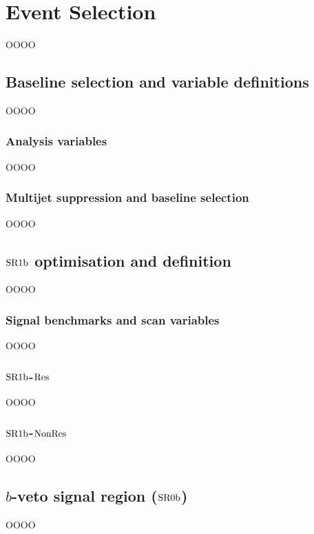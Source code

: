 \chapter{Event Selection}
\label{chap:chapter-7}

OOOO

\section{Baseline selection and variable definitions}
\label{heading:Chapters-CH7-2}

OOOO

\subsection{Analysis variables}
\label{heading:Chapters-CH7-3}

OOOO

\subsection{Multijet suppression and baseline selection}
\label{heading:Chapters-CH7-4}

OOOO

\section[$\bTagSR$ optimisation and definition]{$\bTagSR$ optimisation and definition}
\label{heading:Chapters-CH7-5}

OOOO

\subsection{Signal benchmarks and scan variables}
\label{heading:Chapters-CH7-6}

OOOO

\subsection[SR1b-Res definition]{$\bTagSR$-$\mathrm{Res}$}
\label{heading:Chapters-CH7-7}

OOOO

\subsection[SR1b-NonRes definition]{$\bTagSR$-$\mathrm{NonRes}$}
\label{heading:Chapters-CH7-8}

OOOO

\section[b-veto signal region (SR0b)]{$b$-veto signal region ($\mathrm{SR0b}$)}
\label{heading:Chapters-CH7-9}

OOOO

